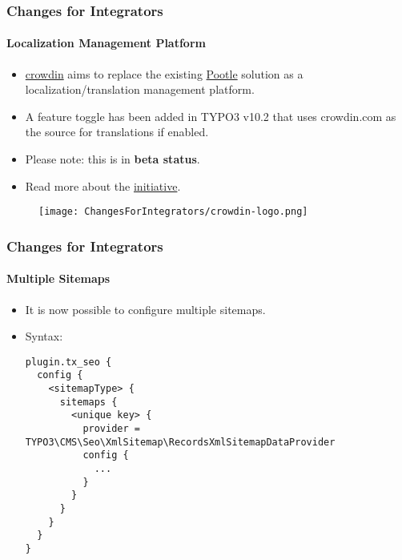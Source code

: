 
\begin{frame}[fragile]
	\frametitle{Changes for Integrators}
	\framesubtitle{Localization Management Platform}

	\begin{itemize}

		\item \href{https://crowdin.com/}{crowdin} aims to replace the existing
			\href{https://translation.typo3.org/}{Pootle}
			solution as a localization/translation management platform.

		\item A feature toggle has been added in TYPO3 v10.2 that uses crowdin.com
			as the source for translations if enabled.

		\item Please note: this is in \textbf{beta status}.

		\item Read more about the
			\href{https://typo3.org/community/teams/typo3-development/initiatives/localization-with-crowdin/}{initiative}.

	\end{itemize}

	\begin{figure}
		\texttt{[image: ChangesForIntegrators/crowdin-logo.png]}
	\end{figure}

\end{frame}


\begin{frame}[fragile]
	\frametitle{Changes for Integrators}
	\framesubtitle{Multiple Sitemaps}

	\lstset{basicstyle=\tiny\ttfamily}

	\begin{itemize}

		\item It is now possible to configure multiple sitemaps.
		\item Syntax:
\begin{lstlisting}
plugin.tx_seo {
  config {
    <sitemapType> {
      sitemaps {
        <unique key> {
          provider = TYPO3\CMS\Seo\XmlSitemap\RecordsXmlSitemapDataProvider
          config {
            ...
          }
        }
      }
    }
  }
}
\end{lstlisting}

	\end{itemize}

\end{frame}

